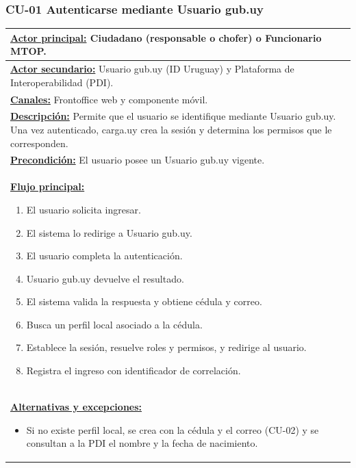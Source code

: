 \subsubsection{CU-01 Autenticarse mediante Usuario gub.uy}\label{sec:cu-01}
\begin{table}[H]
\small
\setlength{\tabcolsep}{8pt}
\renewcommand{\arraystretch}{1.1}
\centering
\begin{tabular}{|p{15.8cm}|}
\hline
\textbf{\underline{Actor principal:}} Ciudadano (responsable o chofer) o Funcionario MTOP. \\ \hline
\textbf{\underline{Actor secundario:}} Usuario gub.uy (ID Uruguay) y Plataforma de Interoperabilidad (PDI). \\ \hline
\textbf{\underline{Canales:}} Frontoffice web y componente móvil. \\ \hline
\textbf{\underline{Descripción:}} Permite que el usuario se identifique mediante Usuario gub.uy. Una vez autenticado, carga.uy crea la sesión y determina los permisos que le corresponden. \\ \hline
\textbf{\underline{Precondición:}} El usuario posee un Usuario gub.uy vigente. \\ \hline
\textbf{\underline{Flujo principal:}}\par
\begin{enumerate}[leftmargin=*,topsep=2pt,itemsep=1pt,parsep=0pt,partopsep=0pt]
    \item El usuario solicita ingresar.
    \item El sistema lo redirige a Usuario gub.uy.
    \item El usuario completa la autenticación.
    \item Usuario gub.uy devuelve el resultado.
    \item El sistema valida la respuesta y obtiene cédula y correo.
    \item Busca un perfil local asociado a la cédula.
    \item Establece la sesión, resuelve roles y permisos, y redirige al usuario.
    \item Registra el ingreso con identificador de correlación.
\end{enumerate} \\ \hline
\textbf{\underline{Alternativas y excepciones:}}\par
\begin{itemize}[leftmargin=*,topsep=2pt,itemsep=1pt,parsep=0pt,partopsep=0pt]
    \item Si no existe perfil local, se crea con la cédula y el correo (CU-02) y se consultan a la PDI el nombre y la fecha de nacimiento.

\end{itemize}
\end{tabular}
\end{table}
